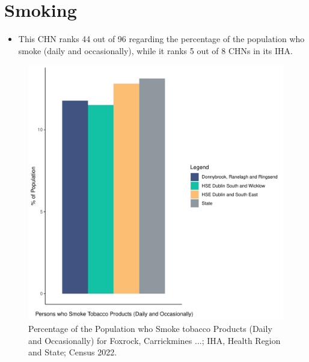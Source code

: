 \documentclass{article}
\begin{document}
\pagebreak

\section{Smoking}\label{sect:Smoking}
\begin{itemize}
\item This CHN ranks  44 out of 96 regarding the percentage of the population who smoke (daily and occasionally), while it ranks   5 out of 8 CHNs in its IHA.
\end{itemize}
\begin{figure}[H]
	\centering
	\includegraphics[width = 120mm]{../figures/SmokingED.pdf}
	\caption{Percentage of the Population who Smoke tobacco Products (Daily and Occasionally) for Foxrock, Carrickmines ...; IHA, Health Region and State; Census 2022.}
	\label{fig:2ae19629-1a6a-13a3-e055-000000000001}
	\end{figure}
	
\end{document}
